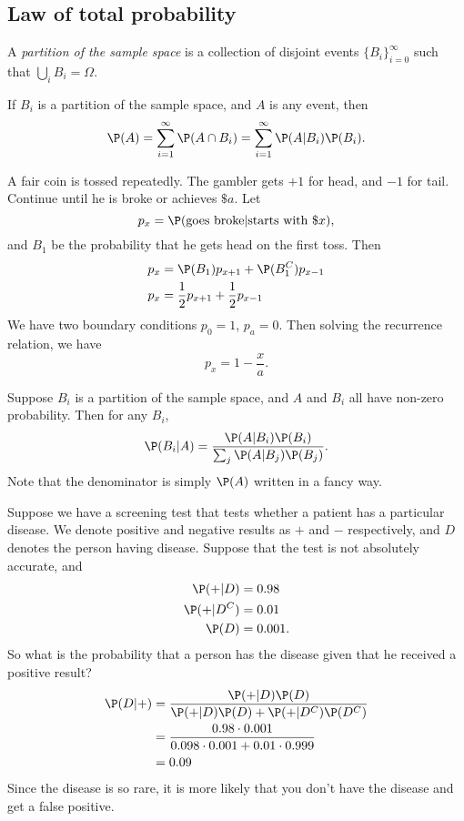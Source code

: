 \documentclass[a4paper]{article}
\begin{document}
\subsection{Law of total probability}
\begin{defi}[Partition]
  A \emph{partition of the sample space} is a collection of disjoint events $\{B_i\}_{i = 0}^\infty$ such that $\bigcup_i B_i = \Omega$.
\end{defi}

\begin{prop}
  If $B_i$ is a partition of the sample space, and $A$ is any event, then
  \[
    \P(A) = \sum_{i = 1}^\infty \P(A\cap B_i) = \sum_{i = 1}^\infty \P(A|B_i) \P(B_i).
  \]
\end{prop}

\begin{eg}
  A fair coin is tossed repeatedly. The gambler gets $+1$ for head, and $-1$ for tail. Continue until he is broke or achieves $\$a$. Let
  \[
    p_x = \P(\text{goes broke}|\text{starts with \$}x),
  \]
  and $B_1$ be the probability that he gets head on the first toss. Then
  \begin{align*}
    p_x &= \P(B_1)p_{x + 1} + \P(B_1^C) p_{x - 1}\\
    p_x &= \frac{1}{2}p_{x + 1} + \frac{1}{2}p_{x - 1}
  \end{align*}
  We have two boundary conditions $p_0 = 1$, $p_a = 0$. Then solving the recurrence relation, we have
  \[
    p_x = 1 - \frac{x}{a}.
  \]
\end{eg}

\begin{thm}
  Suppose $B_i$ is a partition of the sample space, and $A$ and $B_i$ all have non-zero probability. Then for any $B_i$,
  \[
    \P(B_i | A) = \frac{\P(A | B_i)\P(B_i)}{\sum_j\P(A | B_j)\P(B_j)}.
  \]
  Note that the denominator is simply $\P(A)$ written in a fancy way.
\end{thm}

\begin{eg}
  Suppose we have a screening test that tests whether a patient has a particular disease. We denote positive and negative results as $+$ and $-$ respectively, and $D$ denotes the person having disease. Suppose that the test is not absolutely accurate, and
  \begin{align*}
    \P(+ | D) &= 0.98\\
    \P(+ | D^C) &= 0.01\\
    \P(D) &= 0.001.
  \end{align*}
  So what is the probability that a person has the disease given that he received a positive result?
  \begin{align*}
    \P(D|+) &= \frac{\P(+ | D)\P(D)}{\P(+|D)\P(D) + \P(+|D^C)\P(D^C)}\\
    &= \frac{0.98\cdot 0.001}{0.098\cdot 0.001 + 0.01\cdot 0.999}\\
    &=  0.09
  \end{align*}
  Since the disease is so rare, it is more likely that you don't have the disease and get a false positive.
\end{eg}
\end{document}
